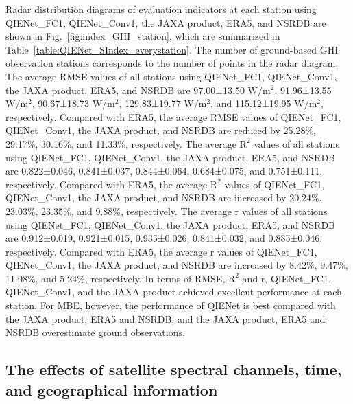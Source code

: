 \documentclass[review]{elsarticle}
\begin{document}
Radar distribution diagrams of evaluation indicators at each station using QIENet\_FC1, QIENet\_Conv1, the JAXA product, ERA5, and NSRDB are shown in Fig.~\ref{fig:index_GHI_station}, which are summarized in Table~\ref{table:QIENet_SIndex_everystation}.
The number of ground-based GHI observation stations corresponds to the number of points in the radar diagram.
The average RMSE values of all stations using QIENet\_FC1, QIENet\_Conv1, the JAXA product, ERA5, and NSRDB are 97.00±13.50 $\mathrm{W/m^{2}}$, 91.96±13.55 $\mathrm{W/m^{2}}$, 90.67±18.73 $\mathrm{W/m^{2}}$, 129.83±19.77 $\mathrm{W/m^{2}}$, and 115.12±19.95 $\mathrm{W/m^{2}}$, respectively.
Compared with ERA5, the average RMSE values of QIENet\_FC1, QIENet\_Conv1, the JAXA product, and NSRDB are reduced by 25.28\%, 29.17\%, 30.16\%, and 11.33\%, respectively.
The average $\mathrm{R^{2}}$ values of all stations using QIENet\_FC1, QIENet\_Conv1, the JAXA product, ERA5, and NSRDB are 0.822±0.046, 0.841±0.037, 0.844±0.064, 0.684±0.075, and 0.751±0.111, respectively.
Compared with ERA5, the average $\mathrm{R^{2}}$ values of QIENet\_FC1, QIENet\_Conv1, the JAXA product, and NSRDB are increased by 20.24\%, 23.03\%, 23.35\%, and 9.88\%, respectively.
The average $\mathrm{r}$ values of all stations using QIENet\_FC1, QIENet\_Conv1, the JAXA product, ERA5, and NSRDB are 0.912±0.019, 0.921±0.015, 0.935±0.026, 0.841±0.032, and 0.885±0.046, respectively.
Compared with ERA5, the average $\mathrm{r}$ values of QIENet\_FC1, QIENet\_Conv1, the JAXA product, and NSRDB are increased by 8.42\%, 9.47\%, 11.08\%, and 5.24\%, respectively.
In terms of RMSE, $\mathrm{R^{2}}$ and r, QIENet\_FC1, QIENet\_Conv1, and the JAXA product achieved excellent performance at each station.
For MBE, however, the performance of QIENet is best compared with the JAXA product, ERA5 and NSRDB, and the JAXA product, ERA5 and NSRDB overestimate ground observations.

\subsection{The effects of satellite spectral channels, time, and geographical information}
\label{sub:the_effects_of_input_variables}
\end{document}
